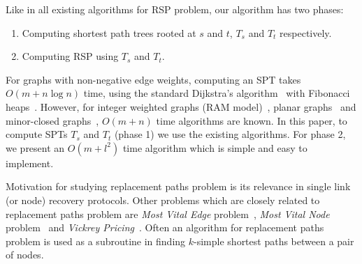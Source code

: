 \documentclass[11pt,a4paper]{llncs}
\begin{document}
Like in all existing algorithms for RSP problem, our algorithm has two phases:
\begin{enumerate}
  \item Computing shortest path trees rooted at $s$ and $t$, $T_{s}$ and $T_{t}$ respectively.
  \item Computing RSP using $T_{s}$ and $T_{t}$.
\end{enumerate}
For graphs with non-negative edge weights, computing
an SPT takes $O(m + n \log n)$ time, using the standard Dijkstra's algorithm~\cite{dijkstra} with
Fibonacci heaps~\cite{fheaps}. However, for integer weighted graphs (RAM model)~\cite{thorup},
planar graphs~\cite{planarspt} and minor-closed graphs~\cite{minorspt},
$O(m+n)$ time algorithms are known. In this paper, to compute SPTs $T_{s}$ and $T_{t}$ (phase 1)
we use the existing algorithms. For phase 2, we present an $O(m + l^2)$ time algorithm
which is simple and easy to implement.

Motivation for studying replacement paths problem is its relevance in single link (or node) recovery protocols.
Other problems which are closely related to replacement paths problem are \emph{Most Vital Edge} problem~\cite{fastermve},
\emph{Most Vital Node} problem~\cite{mostvn} and \emph{Vickrey Pricing}~\cite{vickreyprice}.
Often an algorithm for replacement paths problem is used as a subroutine in finding $k$-simple
shortest paths between a pair of nodes.
\end{document}
